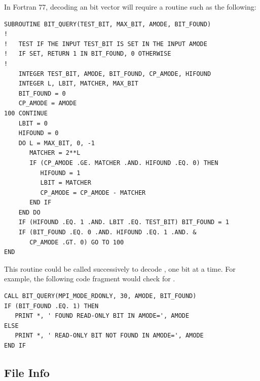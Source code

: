 \begin{example}
\label{io-amode}
In Fortran 77, decoding an  bit vector will
require a routine such as the following:

\begin{lstlisting}[language={[MPI]Fortran}]
SUBROUTINE BIT_QUERY(TEST_BIT, MAX_BIT, AMODE, BIT_FOUND)
!
!   TEST IF THE INPUT TEST_BIT IS SET IN THE INPUT AMODE
!   IF SET, RETURN 1 IN BIT_FOUND, 0 OTHERWISE
!
    INTEGER TEST_BIT, AMODE, BIT_FOUND, CP_AMODE, HIFOUND
    INTEGER L, LBIT, MATCHER, MAX_BIT
    BIT_FOUND = 0
    CP_AMODE = AMODE
100 CONTINUE
    LBIT = 0
    HIFOUND = 0
    DO L = MAX_BIT, 0, -1
       MATCHER = 2**L
       IF (CP_AMODE .GE. MATCHER .AND. HIFOUND .EQ. 0) THEN
          HIFOUND = 1
          LBIT = MATCHER
          CP_AMODE = CP_AMODE - MATCHER
       END IF
    END DO
    IF (HIFOUND .EQ. 1 .AND. LBIT .EQ. TEST_BIT) BIT_FOUND = 1
    IF (BIT_FOUND .EQ. 0 .AND. HIFOUND .EQ. 1 .AND. &
       CP_AMODE .GT. 0) GO TO 100
END
\end{lstlisting}

This routine could be called successively to decode ,
one bit at a time.  For example, the following code fragment would
check for .

\begin{lstlisting}[language={[MPI]Fortran}]
CALL BIT_QUERY(MPI_MODE_RDONLY, 30, AMODE, BIT_FOUND)
IF (BIT_FOUND .EQ. 1) THEN
   PRINT *, ' FOUND READ-ONLY BIT IN AMODE=', AMODE
ELSE
   PRINT *, ' READ-ONLY BIT NOT FOUND IN AMODE=', AMODE
END IF
\end{lstlisting}
\end{example}

\subsection{File Info}
\label{sec:io-info}

